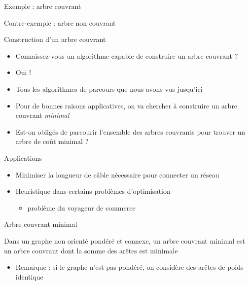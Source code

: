 \begin{frame}{Exemple : arbre couvrant}
    \begin{center}
        
    \end{center}
    \end{frame}

    \begin{frame}{Contre-exemple : arbre non couvrant}
        \begin{center}
            
        \end{center}
        \end{frame}
    
\begin{frame}{Construction d'un arbre couvrant}
\begin{itemize}
    \item Connaissez-vous un algorithme capable de construire un arbre couvrant ?
    \pause \item Oui !
    \pause \item Tous les algorithmes de parcours que nous avons vus jusqu'ici 
    \pause \item Pour de bonnes raisons applicatives, on va chercher à construire un arbre couvrant \emph{minimal} 
    \pause \item Est-on obligés de parcourir l'ensemble des arbres couvrants pour trouver un arbre de coût minimal ?
\end{itemize}
    
\end{frame}

\begin{frame}{Applications}
    \begin{itemize}
        \item Minimiser la longueur de câble nécessaire pour connecter un réseau 
        \item Heuristique dans certains problèmes d'optimisation
        \begin{itemize}
            \item problème du voyageur de commerce
        \end{itemize}
    \end{itemize}
\end{frame}

\begin{frame}{Arbre couvrant minimal}
    \begin{definition}
        Dans un graphe non orienté pondéré et connexe, un arbre couvrant minimal est un arbre couvrant dont la somme des arêtes est minimale
    \end{definition}

    \begin{itemize}
        \item Remarque : si le graphe n'est pas pondéré, on considère des arêtes de poids identique 
    \end{itemize}
\end{frame}

